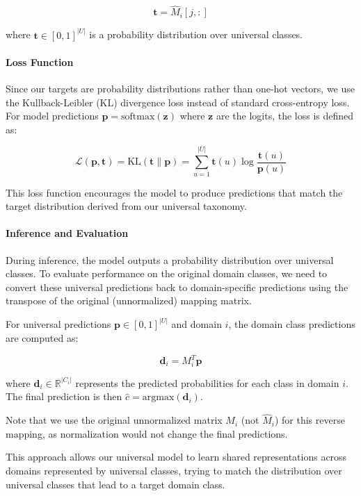 \begin{equation}
      \mathbf{t} = \hat{M}_i[j, :]
\end{equation}

where $\mathbf{t} \in [0,1]^{|U|}$ is a probability distribution over universal classes.

\paragraph{Loss Function}

Since our targets are probability distributions rather than one-hot vectors,
we use the Kullback-Leibler (KL) divergence loss instead of standard cross-entropy loss.
For model predictions $\mathbf{p} = \text{softmax}(\mathbf{z})$ where $\mathbf{z}$ are the logits,
the loss is defined as:

\begin{equation}
      \mathcal{L}(\mathbf{p}, \mathbf{t}) = \text{KL}(\mathbf{t} \| \mathbf{p}) = \sum_{u=1}^{|U|} \mathbf{t}(u) \log \frac{\mathbf{t}(u)}{\mathbf{p}(u)}
\end{equation}

This loss function encourages the model to produce predictions that match
the target distribution derived from our universal taxonomy.

\paragraph{Inference and Evaluation}

During inference, the model outputs a probability distribution over universal classes.
To evaluate performance on the original domain classes, we need to convert these universal predictions
back to domain-specific predictions using the transpose of the original (unnormalized) mapping matrix.

For universal predictions $\mathbf{p} \in [0,1]^{|U|}$ and domain $i$,
the domain class predictions are computed as:

\begin{equation}
      \mathbf{d}_i = M_i^T \mathbf{p}
\end{equation}

where $\mathbf{d}_i \in \mathbb{R}^{|C_i|}$ represents the predicted probabilities for each class in domain $i$.
The final prediction is then $\hat{c} = \text{argmax}(\mathbf{d}_i)$.

Note that we use the original unnormalized matrix $M_i$ (not $\hat{M}_i$) for this reverse mapping,
as normalization would not change the final predictions.

This approach allows our universal model to learn shared representations across domains
represented by universal classes, trying to match the distribution over universal classes
that lead to a target domain class.
